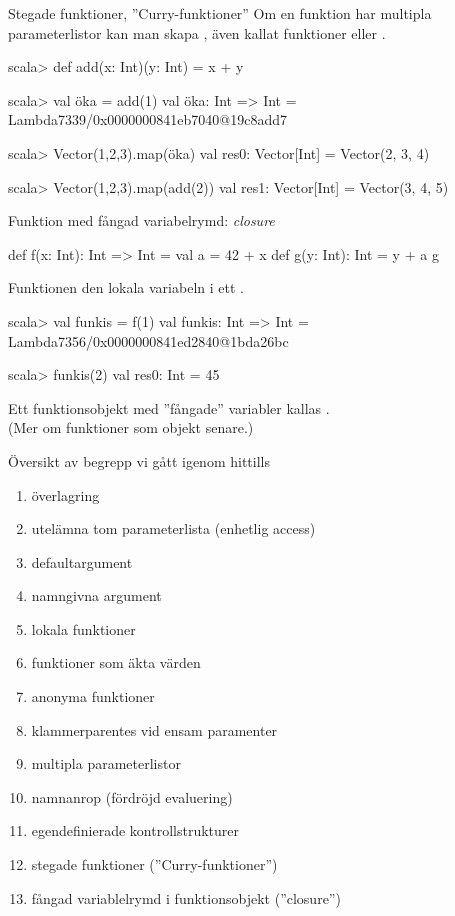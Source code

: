 \begin{Slide}{Stegade funktioner, ''Curry-funktioner''}
	Om en funktion har multipla parameterlistor kan man skapa , även kallat  funktioner  eller .
	\begin{REPLnonum}
		scala> def add(x: Int)(y: Int) = x + y

		scala> val öka = add(1)
		val öka: Int => Int = Lambda7339/0x0000000841eb7040@19c8add7

		scala> Vector(1,2,3).map(öka)
		val res0: Vector[Int] = Vector(2, 3, 4)

		scala> Vector(1,2,3).map(add(2))
		val res1: Vector[Int] = Vector(3, 4, 5)
	\end{REPLnonum}
\end{Slide}

\begin{Slide}{Funktion med fångad variabelrymd: \textit{closure}}
	\begin{Code}
		def f(x: Int): Int => Int =
		val a = 42 + x
		def g(y: Int): Int = y + a
		g
	\end{Code}
	Funktionen   den lokala variabeln  i ett .
	\pause
	\begin{REPLnonum}
		scala> val funkis = f(1)
		val funkis: Int => Int = Lambda7356/0x0000000841ed2840@1bda26bc

		scala> funkis(2)
		val res0: Int = 45
	\end{REPLnonum}
	\pause
	Ett funktionsobjekt med ''fångade'' variabler kallas . \\
	(Mer om funktioner som objekt senare.)
\end{Slide}

\ifkompendium\else
	\begin{SlideExtra}{Översikt av begrepp vi gått igenom hittills}
		\begin{enumerate}
			\item överlagring
			\item utelämna tom parameterlista (enhetlig access)
			\item defaultargument
			\item namngivna argument
			\item lokala funktioner
			\item funktioner som äkta värden
			\item anonyma funktioner
			\item klammerparentes vid ensam paramenter
			\item multipla parameterlistor
			\item namnanrop (fördröjd evaluering)
			\item egendefinierade kontrollstrukturer
			\item stegade funktioner (''Curry-funktioner'')
			\item fångad variablelrymd i funktionsobjekt (''closure'')
		\end{enumerate}
	\end{SlideExtra}
\fi

